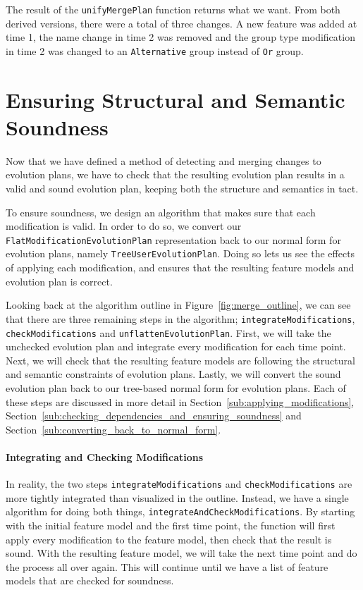 \documentclass[a4paper,english]{ifimaster}
\begin{document}
The result of the \texttt{unify\-Merge\-Plan} function returns what we want. From both derived versions, there were a total of three changes. A new feature was added at time 1, the name change in time 2 was removed and the group type modification in time 2 was changed to an \texttt{Alternative} group instead of \texttt{Or} group.

\section{Ensuring Structural and Semantic Soundness}%
\label{sec:ensuring_structural_and_semantic_soundness_of_merge_result}

Now that we have defined a method of detecting and merging changes to evolution plans, we have to check that the resulting evolution plan results in a valid and sound evolution plan, keeping both the structure and semantics in tact.

To ensure soundness, we design an algorithm that makes sure that each modification is valid. In order to do so, we convert our \texttt{Flat\-Modification\-Evolution\-Plan} representation back to our normal form for evolution plans, namely \texttt{Tree\-User\-Evolution\-Plan}. Doing so lets us see the effects of applying each modification, and ensures that the resulting feature models and evolution plan is correct.

Looking back at the algorithm outline in Figure~\vref{fig:merge_outline}, we can see that there are three remaining steps in the algorithm; \texttt{integrate\-Modifications}, \texttt{check\-Modifications} and \texttt{unflatten\-Evolution\-Plan}. First, we will take the unchecked evolution plan and integrate every modification for each time point. Next, we will check that the resulting feature models are following the structural and semantic constraints of evolution plans. Lastly, we will convert the sound evolution plan back to our tree-based normal form for evolution plans. Each of these steps are discussed in more detail in Section~\ref{sub:applying_modifications}, Section~\ref{sub:checking_dependencies_and_ensuring_soundness} and Section~\ref{sub:converting_back_to_normal_form}. 

\paragraph{Integrating and Checking Modifications}%
\label{par:integrating_and_checking_modifications}

In reality, the two steps \texttt{integrate\-Modifications} and \texttt{check\-Modifications} are more tightly integrated than visualized in the outline. Instead, we have a single algorithm for doing both things, \texttt{integrate\-And\-Check\-Modifications}. By starting with the initial feature model and the first time point, the function will first apply every modification to the feature model, then check that the result is sound. With the resulting feature model, we will take the next time point and do the process all over again. This will continue until we have a list of feature models that are checked for soundness.
\end{document}
